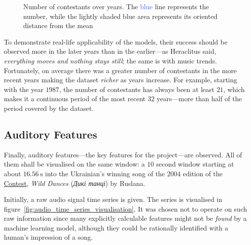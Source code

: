 \documentclass[conference, a4paper, 12pt]{IEEEtran}
\begin{document}
    \par

    \begin{figure}[tbhp!]
        \centering
        
        \caption[Number of contestants over years]{Number of contestants over years. The \textcolor{RoyalBlue}{blue} line represents the number, while the lightly \colorbox{white!75!RoyalBlue}{shaded blue} area represents its oriented distance from the mean}
        \label{fig:number_of_contestants_over_years}
    \end{figure}

    \par

    To demonstrate real-life applicability of the models, their success should be observed more in the later years than in the earlier---as Heraclitus said, \emph{everything moves and nothing stays still}; the same is with music trends. Fortunately, on average there was a greater number of contestants in the more recent years making the dataset \emph{richer} as years increase. For example, starting with the year $ 1987 $, the number of contestants has always been at least $ 21 $, which makes it a continuous period of the most recent $ 32 $ years---more than half of the period covered by the dataset.

    \par

    \subsection{Auditory Features}
    \label{subsec:auditory_features}

    Finally, auditory features---the key features for the project---are observed. All of them shall be visualised on the same window: a $ 10 $ second window starting at about $ \SI{16.56}{\second} $ into the Ukrainian's winning song of the $ 2004 $ edition of the \href{http://eurovision.tv/}{Contest}, \emph{Wild Dances} (\emph{\foreignlanguage{ukrainian}{Дикі танці}}) by \foreignlanguage{ukrainian}{Ruslana}.

    \par

    Initially, a raw audio signal time series is given. The series is visualised in figure~\ref{fig:audio_time_series_visualisation}. It was chosen not to operate on such raw information since many explicitly calculable features might not be \emph{found} by a machine learning model, although they could be rationally identified with a human's impression of a song.
\end{document}
